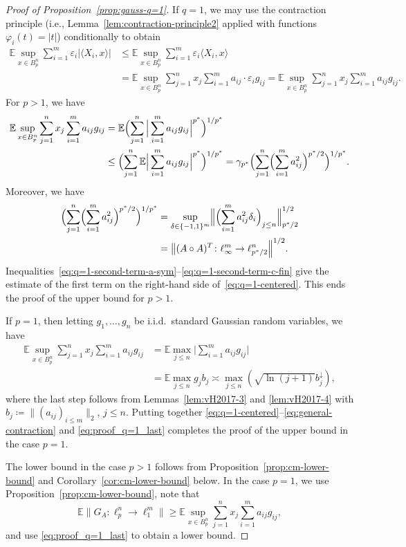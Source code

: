 \documentclass[a4paper]{amsart}
\theoremstyle{definition}
\theoremstyle{remark}
\numberwithin{equation}{section}
\newcommand*{\EE}{\mathbb{E}}
\newcommand*{\hadprod}{\mathbin{\circ}} %
\newcommand*{\rearr}{\downarrow} %
\begin{document}
\begin{proof}[Proof of Proposition~\ref{prop:gauss-q=1}]
If $q=1$, we may use the contraction principle (i.e., Lemma~\ref{lem:contraction-principle2} applied with functions $\varphi_i(t)=|t|$)
conditionally to obtain
\begin{align}
	\EE \sup_{x\in B_{p}^n} \sum_{i=1}^m \varepsilon_i |\langle X_i,x \rangle|
	& \leq
	\EE \sup_{x\in B_{p}^n} \sum_{i=1}^m  \varepsilon_i\langle X_i,x \rangle\nonumber\\
	&= \EE \sup_{x\in B_{p}^n} \sum_{j=1}^n x_j \sum_{i=1}^m  a_{ij}\cdot  \varepsilon_i g_{ij}
	 = \EE \sup_{x\in B_{p}^n} \sum_{j=1}^n x_j \sum_{i=1}^m  a_{ij} g_{ij}.	\label{eq:general-contraction}
\end{align}
For $p > 1$, we have
\begin{align}
 \EE \sup_{x\in B_{p}^n} \sum_{j=1}^n x_j \sum_{i=1}^m  a_{ij} g_{ij} &=\EE \Bigl( \sum_{j=1}^n\Big|\sum_{i=1}^m a_{ij}g_{ij}\Big|^{p^*}\Bigr)^{1/p^*} \nonumber\\
	& \leq \Bigl( \sum_{j=1}^n \EE \Big|\sum_{i=1}^m a_{ij}g_{ij}\Big|^{p^*}\Bigr)^{1/p^*}
	= \gamma_{p^*} \Bigl(\sum_{j=1}^n \Bigl(\sum_{i=1}^m a_{ij}^2\Bigr)^{p^*/2}\Bigr)^{1/p^*}.\label{eq:q=1-second-term-b-contr}
\end{align}
Moreover, we have
\begin{align}
	\Bigl(\sum_{j=1}^n \Bigl(\sum_{i=1}^m a_{ij}^2\Bigr)^{p^*/2}\Bigr)^{1/p^*}
	& = \sup_{\delta\in\{-1,1 \}^m} \Bigl\|\Bigl(\sum_{i=1}^ma_{ij}^2\delta_i\Bigr)_{j\le n} \Bigr\|_{p^*/2}^{1/2} \nonumber\\
	& = \bigl\| (A\hadprod A)^T\colon \ell_\infty^m \to \ell_{p^*/2}^n \Bigr\|^{1/2}.\label{eq:q=1-second-term-c-fin}
\end{align}
Inequalities~\eqref{eq:q=1-second-term-a-sym}--\eqref{eq:q=1-second-term-c-fin} give the estimate of the first term on the right-hand side of~\eqref{eq:q=1-centered}.
This ends the proof of the upper bound for $p > 1$.

If $p = 1$, then letting $g_1,\ldots,g_n$ be i.i.d.\ standard Gaussian random variables, we have
\begin{align}	\label{eq:proof_q=1_last}	\nonumber
\EE \sup_{x\in B_{p}^n} \sum_{j=1}^n x_j \sum_{i=1}^m  a_{ij} g_{ij} &= \EE \max_{j\le n} \Big|\sum_{i=1}^m a_{ij} g_{ij}\Big| \\
&= \EE \max_{j\le n} g_j b_j \asymp \max_{j\le n} (\sqrt{\ln(j+1)}b_j^{\rearr{}}),
\end{align}
where the last step follows from Lemmas~\ref{lem:vH2017-3} and \ref{lem:vH2017-4} with $b_j \coloneqq \|(a_{ij})_{i\le m}\|_2$, $j\leq n$.
Putting together \eqref{eq:q=1-centered}--\eqref{eq:general-contraction} and \eqref{eq:proof_q=1_last} completes the proof of the upper bound in the case $p=1$.

The lower bound in the case $p>1$ follows from Proposition~\ref{prop:cm-lower-bound} and Corollary~\ref{cor:cm-lower-bound} below. In the case $p=1$, we use Proposition~\ref{prop:cm-lower-bound}, note that
\[
\EE \| G_A \colon \ell_{p}^n \to\ell_1^m \| \geq\EE \sup_{x\in B_{p}^n} \sum_{j=1}^n x_j \sum_{i=1}^m  a_{ij} g_{ij},
\]
and use \eqref{eq:proof_q=1_last} to obtain a lower bound.
\end{proof}
\end{document}
